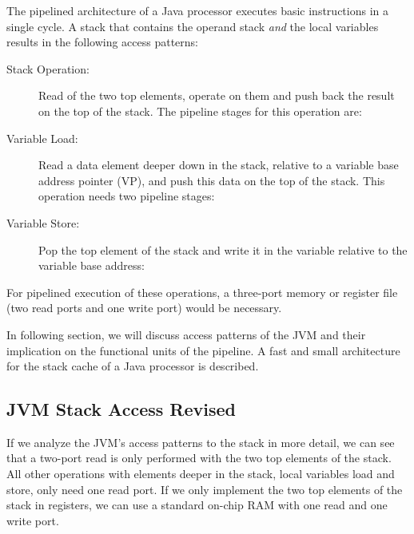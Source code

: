 The pipelined architecture of a Java processor executes basic
instructions in a single cycle. A stack that contains the operand
stack \emph{and} the local variables results in the following access
patterns:
%
\begin{description}
\item[Stack Operation:] Read of the two top elements, operate on
    them and push back the result on the top of the stack. The
    pipeline stages for this operation are:\newline {}

\item[Variable Load:] Read a data element deeper down in the
    stack, relative to a variable base address pointer (VP), and
    push this data on the top of the stack. This operation needs
    two pipeline stages:\newline {}

\item[Variable Store:] Pop the top element of the stack and write
    it in the variable relative to the variable base
    address:\newline {}
\end{description}
%
For pipelined execution of these operations, a three-port memory or
register file (two read ports and one write port) would be necessary.


In following section, we will discuss access patterns of the JVM and
their implication on the functional units of the pipeline. A fast and
small architecture for the stack cache of a Java processor is
described.

\subsection{JVM Stack Access Revised}

If we analyze the JVM's access patterns to the stack in more detail,
we can see that a two-port read is only performed with the two top
elements of the stack. All other operations with elements deeper in
the stack, local variables load and store, only need one read port.
If we only implement the two top elements of the stack in registers,
we can use a standard on-chip RAM with one read and one write port.

